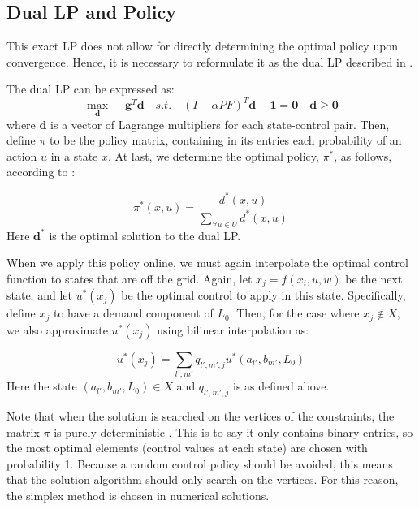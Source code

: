 \documentclass[conference]{IEEEtran}
\begin{document}
\subsection{Dual LP and Policy}
This exact LP does not allow for directly determining the optimal policy upon convergence. Hence, it is necessary to reformulate it as the dual LP described in \cite{4220813}.

The dual LP can be expressed as:
\begin{equation}
    \max_{\boldsymbol{d}} -\boldsymbol{g}^{T} \boldsymbol{d}
    \hspace{1em}s.t.\hspace{1em}(I-\alpha PF)^{T}\boldsymbol{d} - \boldsymbol{1} = \boldsymbol{0}\hspace{1em}\boldsymbol{d} \geq \boldsymbol{0}
\end{equation}
where $\boldsymbol{d}$ is a vector of Lagrange multipliers for each state-control pair. Then, define $\pi$ to be the policy matrix, containing in its entries each probability of an action $u$ in a state $x$. At last, we determine the optimal policy, $\pi^{*}$, as follows, according to \cite{4220813}:

\begin{equation}
\pi^{*}(x,u)=\frac{d^{*}(x,u)}{\sum_{\forall u \in U}d^{*}(x,u)}
\end{equation} Here $\boldsymbol{d^{*}}$ is the optimal solution to the dual LP.

When we apply this policy online, we must again interpolate the optimal control function to states that are off the grid. Again, let $x_{j}=f(x_{i}, u, w)$ be the next state, and let $u^{*}(x_{j})$ be the optimal control to apply in this state. Specifically, define $x_{j}$ to have a demand component of $L_{0}$. Then, for the case where $x_{j}\not\in X$, we also approximate $u^{*}(x_{j})$ using bilinear interpolation as:

\begin{equation}
    u^{*}(x_{j})=\sum_{l',m'}q_{l',m',j}u^{*}(a_{l'},b_{m'},L_{0})
\end{equation} Here the state $(a_{l'},b_{m'},L_{0})\in X$ and $q_{l',m',j}$ is as defined above.

Note that when the solution is searched on the vertices of the constraints, the matrix $\pi$ is purely deterministic \cite{MDPs}. This is to say it only contains binary entries, so the most optimal elements (control values at each state) are chosen with probability 1. Because a random control policy should be avoided, this means that the solution algorithm should only search on the vertices. For this reason, the simplex method is chosen in numerical solutions.
\end{document}
